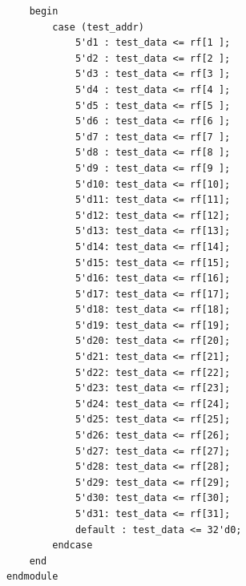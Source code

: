 \documentclass{article}
\begin{document}
\begin{verbatim}
    begin
        case (test_addr)
            5'd1 : test_data <= rf[1 ];
            5'd2 : test_data <= rf[2 ];
            5'd3 : test_data <= rf[3 ];
            5'd4 : test_data <= rf[4 ];
            5'd5 : test_data <= rf[5 ];
            5'd6 : test_data <= rf[6 ];
            5'd7 : test_data <= rf[7 ];
            5'd8 : test_data <= rf[8 ];
            5'd9 : test_data <= rf[9 ];
            5'd10: test_data <= rf[10];
            5'd11: test_data <= rf[11];
            5'd12: test_data <= rf[12];
            5'd13: test_data <= rf[13];
            5'd14: test_data <= rf[14];
            5'd15: test_data <= rf[15];
            5'd16: test_data <= rf[16];
            5'd17: test_data <= rf[17];
            5'd18: test_data <= rf[18];
            5'd19: test_data <= rf[19];
            5'd20: test_data <= rf[20];
            5'd21: test_data <= rf[21];
            5'd22: test_data <= rf[22];
            5'd23: test_data <= rf[23];
            5'd24: test_data <= rf[24];
            5'd25: test_data <= rf[25];
            5'd26: test_data <= rf[26];
            5'd27: test_data <= rf[27];
            5'd28: test_data <= rf[28];
            5'd29: test_data <= rf[29];
            5'd30: test_data <= rf[30];
            5'd31: test_data <= rf[31];
            default : test_data <= 32'd0;
        endcase
    end
endmodule
\end{verbatim}
\end{document}
